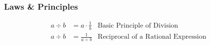 \documentclass{article}
\begin{document}
    \subsubsection{Laws \& Principles}
    \begin{align*}
        a \div b &= a \cdot \frac{1}{b} &\text{Basic Principle of Division}\\
        a \div b &= \frac{1}{a \div b} &\text{Reciprocal of a Rational Expression}
    \end{align*}
    \clearpage

    \clearpage
    
    
\end{document}
